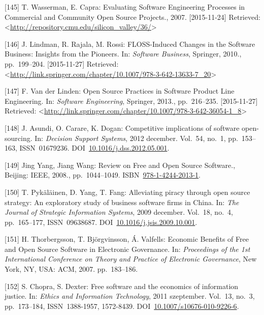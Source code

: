 \documentclass[12pt,magyar,a4paper,oneside]{scrreprt}
\begin{document}
\leavevmode\hypertarget{ref-wasserman_evaluating_2007}{}%
{[}145{]} T. Wasserman, E. Capra: Evaluating Software Engineering
Processes in Commercial and Community Open Source Projects., 2007.
{[}2015-11-24{]} Retrieved:
\textless{}\url{http://repository.cmu.edu/silicon_valley/36/}\textgreater{}

\leavevmode\hypertarget{ref-lindman_floss-induced_2010}{}%
{[}146{]} J. Lindman, R. Rajala, M. Rossi: FLOSS-Induced Changes in the
Software Business: Insights from the Pioneers. In: \emph{Software
Business}, Springer, 2010., pp.~199--204. {[}2015-11-27{]} Retrieved:
\textless{}\url{http://link.springer.com/chapter/10.1007/978-3-642-13633-7_20}\textgreater{}

\leavevmode\hypertarget{ref-van_der_linden_open_2013}{}%
{[}147{]} F. Van der Linden: Open Source Practices in Software Product
Line Engineering. In: \emph{Software Engineering}, Springer, 2013.,
pp.~216--235. {[}2015-11-27{]} Retrieved:
\textless{}\url{http://link.springer.com/chapter/10.1007/978-3-642-36054-1_8}\textgreater{}

\leavevmode\hypertarget{ref-asundi_competitive_2012}{}%
{[}148{]} J. Asundi, O. Carare, K. Dogan: Competitive implications of
software open-sourcing. In: \emph{Decision Support Systems}, 2012
december. Vol.~54, no.~1, pp.~153--163, ISSN~01679236.
DOI~\href{https://doi.org/10.1016/j.dss.2012.05.001}{10.1016/j.dss.2012.05.001}.

\leavevmode\hypertarget{ref-jing_yang_review_2008}{}%
{[}149{]} Jing Yang, Jiang Wang: Review on Free and Open Source
Software., Beijing: IEEE, 2008., pp.~1044--1049.
ISBN~\href{https://worldcat.org/isbn/978-1-4244-2013-1}{978-1-4244-2013-1}.

\leavevmode\hypertarget{ref-pykalainen_alleviating_2009}{}%
{[}150{]} T. Pykäläinen, D. Yang, T. Fang: Alleviating piracy through
open source strategy: An exploratory study of business software firms in
China. In: \emph{The Journal of Strategic Information Systems}, 2009
december. Vol.~18, no.~4, pp.~165--177, ISSN~09638687.
DOI~\href{https://doi.org/10.1016/j.jsis.2009.10.001}{10.1016/j.jsis.2009.10.001}.

\leavevmode\hypertarget{ref-thorbergsson_economic_2007}{}%
{[}151{]} H. Thorbergsson, T. Björgvinsson, Á. Valfells: Economic
Benefits of Free and Open Source Software in Electronic Governance. In:
\emph{Proceedings of the 1st International Conference on Theory and
Practice of Electronic Governance}, New York, NY, USA: ACM, 2007.
pp.~183--186.

\leavevmode\hypertarget{ref-chopra_free_2011}{}%
{[}152{]} S. Chopra, S. Dexter: Free software and the economics of
information justice. In: \emph{Ethics and Information Technology}, 2011
szeptember. Vol.~13, no.~3, pp.~173--184, ISSN~1388-1957, 1572-8439.
DOI~\href{https://doi.org/10.1007/s10676-010-9226-6}{10.1007/s10676-010-9226-6}.
\end{document}
